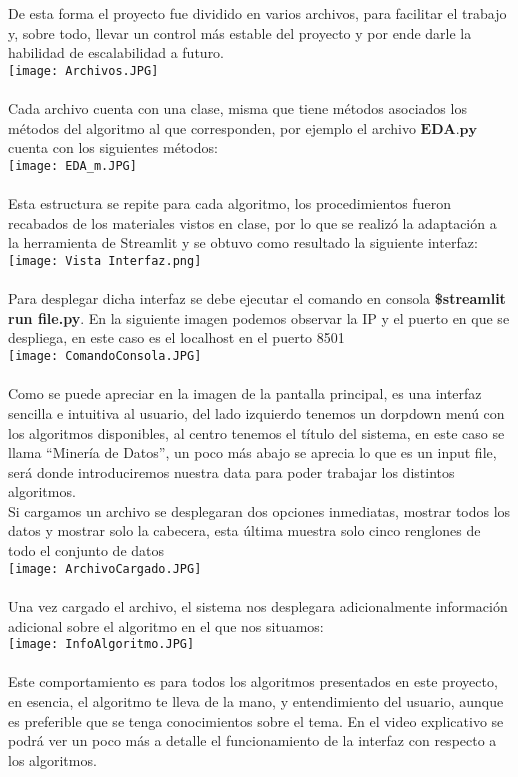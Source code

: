 \documentclass[10pt,a4paper]{article}
\begin{document}
\\ \\
De esta forma el proyecto fue dividido en varios archivos, para facilitar el trabajo y, sobre todo, llevar un control más estable del proyecto y por ende darle la habilidad de escalabilidad a futuro.\\
\texttt{[image: Archivos.JPG]}
\\ \\
Cada archivo cuenta con una clase, misma que tiene métodos asociados los métodos del algoritmo al que corresponden, por ejemplo el archivo $\textbf{EDA.py}$ cuenta con los siguientes métodos:  
\\
\texttt{[image: EDA\_m.JPG]}
\\ \\ 
Esta estructura se repite para cada algoritmo, los procedimientos fueron recabados de los materiales vistos en clase, por lo que se realizó la adaptación a la herramienta de Streamlit y se obtuvo como resultado la siguiente interfaz: \\
\texttt{[image: Vista Interfaz.png]}
\\ \\
Para desplegar dicha interfaz se debe ejecutar el comando en consola \textbf{\$streamlit run file.py}. En la siguiente imagen podemos observar la IP y el puerto en que se despliega, en este caso es el localhost en el puerto 8501 \\
\texttt{[image: ComandoConsola.JPG]}
\\ \\
Como se puede apreciar en la imagen de la pantalla principal, es una interfaz sencilla e intuitiva al usuario, del lado izquierdo tenemos un dorpdown menú con los algoritmos disponibles, al centro tenemos el título del sistema, en este caso se llama “Minería de Datos”, un poco más abajo se aprecia lo que es un input file, será donde introduciremos nuestra data para poder trabajar los distintos algoritmos. \\

Si cargamos un archivo se desplegaran dos opciones inmediatas, mostrar todos los datos y mostrar solo la cabecera, esta última muestra solo cinco renglones de todo el conjunto de datos\\
\texttt{[image: ArchivoCargado.JPG]}
\\ \\

Una vez cargado el archivo, el sistema nos desplegara adicionalmente información adicional sobre el algoritmo en el que nos situamos: \\
\texttt{[image: InfoAlgoritmo.JPG]}
\\ \\
Este comportamiento es para todos los algoritmos presentados en este proyecto, en esencia, el algoritmo te lleva de la mano, y entendimiento del usuario, aunque es preferible que se tenga conocimientos sobre el tema. En el video explicativo se podrá ver un poco más a detalle el funcionamiento de la interfaz con respecto a los algoritmos.
\end{document}
